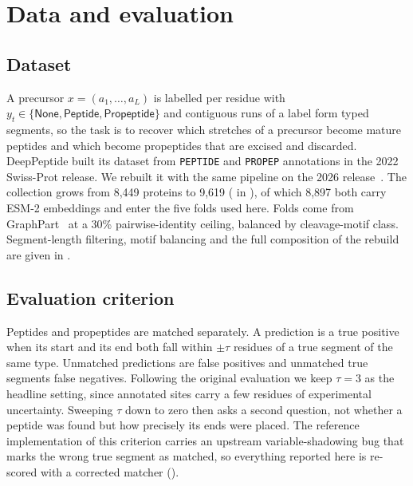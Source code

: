 \documentclass{article}
\begin{document}

\section{Data and evaluation}
\label{sec:eval}

\subsection{Dataset}
\label{sec:dataset}
A precursor $x=(a_1,\dots,a_L)$ is labelled per residue with $y_t \in \{\textsf{None},\textsf{Peptide},\textsf{Propeptide}\}$ and contiguous runs of a label form typed segments, so the task is to recover which stretches of a precursor become mature peptides and which become propeptides that are excised and discarded.
DeepPeptide built its dataset from \texttt{PEPTIDE} and \texttt{PROPEP} annotations in the 2022 Swiss-Prot release. We rebuilt it with the same pipeline on the 2026 release~\citep{uniprot2025}. The collection grows from 8{,}449 proteins to 9{,}619 ( in ), of which 8{,}897 both carry ESM-2 embeddings and enter the five folds used here.
Folds come from GraphPart~\citep{graphpart2023} at a 30\% pairwise-identity ceiling, balanced by cleavage-motif class. Segment-length filtering, motif balancing and the full composition of the rebuild are given in .

\subsection{Evaluation criterion}
\label{sec:matching}

Peptides and propeptides are matched separately. A prediction is a true positive when its start and its end both fall within $\pm\tau$ residues of a true segment of the same type. Unmatched predictions are false positives and unmatched true segments false negatives. Following the original evaluation we keep $\tau=3$ as the headline setting, since annotated sites carry a few residues of experimental uncertainty. Sweeping $\tau$ down to zero then asks a second question, not whether a peptide was found but how precisely its ends were placed. The reference implementation of this criterion carries an upstream variable-shadowing bug that marks the wrong true segment as matched, so everything reported here is re-scored with a corrected matcher ().
\end{document}
